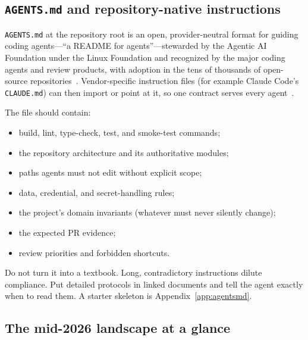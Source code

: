 \documentclass[11pt]{article}
\newcommand{\co}[1]{\lstinline[basicstyle=\ttfamily\color{gwInk}]{#1}}
\begin{document}
\subsection{\texttt{AGENTS.md} and repository-native instructions}

\co{AGENTS.md} at the repository root is an open, provider-neutral format for guiding coding
agents---``a README for agents''---stewarded by the Agentic AI Foundation under the Linux
Foundation and recognized by the major coding agents and review products, with adoption in the
tens of thousands of open-source repositories~\cite{agentsmd2026,github2026copilotagentsmd,%
openai2026agentsmd}. Vendor-specific instruction files (for example Claude Code's \co{CLAUDE.md})
can then import or point at it, so one contract serves every agent~\cite{anthropic2026memory}.

The file should contain:

\begin{itemize}
  \item build, lint, type-check, test, and smoke-test commands;
  \item the repository architecture and its authoritative modules;
  \item paths agents must not edit without explicit scope;
  \item data, credential, and secret-handling rules;
  \item the project's domain invariants (whatever must never silently change);
  \item the expected PR evidence;
  \item review priorities and forbidden shortcuts.
\end{itemize}

Do not turn it into a textbook. Long, contradictory instructions dilute compliance. Put detailed
protocols in linked documents and tell the agent exactly when to read them. A starter skeleton is
Appendix~\ref{app:agentsmd}.

\subsection{The mid-2026 landscape at a glance}
\end{document}
